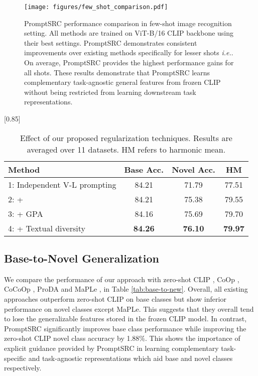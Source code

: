 \documentclass[10pt,twocolumn,letterpaper]{article}
\def\ie{\emph{i.e.}\xspace}
\begin{document}
\begin{figure*}[!ht]
\centering
{\texttt{[image: figures/few\_shot\_comparison.pdf]}}\vspace{-0.5em}
   \caption{\textnormal{PromptSRC performance comparison in few-shot image recognition setting.} All methods are trained on ViT-B/16 CLIP backbone using their best settings. PromptSRC demonstrates consistent improvements over existing methods specifically for lesser shots \ie . On average, PromptSRC provides the highest performance gains for all shots. These results demonstrate that PromptSRC learns complementary task-agnostic general features from frozen CLIP without being restricted from learning downstream task representations.}
\label{fig:few_shot_comparision}
\end{figure*}

\begin{table}[!t]

    \small \centering
 \setlength{\tabcolsep}{8pt}
    \scalebox{0.85}[0.85]{
    \begin{tabular}{l cc | c }
    \toprule
    Method  & Base Acc. & Novel Acc. & HM\\
    \midrule
    1: Independent V-L prompting & 84.21 & 71.79 & 77.51 \\
    2: +  & 84.21 & 75.38 & 79.55 \\
    3: + GPA & 84.16	& 75.69	& 79.70 \\
    \rowcolor{tabhighlight}
    4: + Textual diversity & \textbf{84.26} & \textbf{76.10} & \textbf{79.97} \\
    \bottomrule
    \end{tabular}
    }\vspace{-0.5em}
    \caption{Effect of our proposed regularization techniques. Results are averaged over 11 datasets. HM refers to harmonic mean. 
    }
    \label{tab:ablations_on_components}
\end{table} \subsection{Base-to-Novel Generalization}
We compare the performance of our approach with zero-shot CLIP \cite{radford2021learning}, CoOp \cite{zhou2022learning}, CoCoOp \cite{zhou2022conditional}, ProDA \cite{lu2022prompt} and MaPLe \cite{khattak2023maple}, in Table \ref{tab:base-to-new}. Overall, all existing approaches outperform zero-shot CLIP on base classes but show inferior performance on novel classes {except MaPLe}. This suggests that they {overall} tend to lose the generalizable features stored in the frozen CLIP model. In contrast, PromptSRC significantly improves base class performance while improving the zero-shot CLIP novel class accuracy by 1.88\%. This shows the importance of explicit guidance provided by PromptSRC in learning complementary task-specific and task-agnostic representations which aid base and novel classes respectively.
\end{document}
